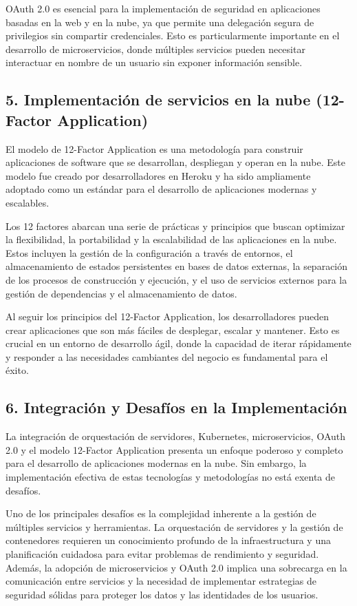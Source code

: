 \documentclass[12pt]{article}
\begin{document}
OAuth 2.0 es esencial para la implementación de seguridad en aplicaciones basadas en la web y en la nube, ya que permite una delegación segura de privilegios sin compartir credenciales. Esto es particularmente importante en el desarrollo de microservicios, donde múltiples servicios pueden necesitar interactuar en nombre de un usuario sin exponer información sensible.

\subsection*{5. Implementación de servicios en la nube (12-Factor Application)}
El modelo de 12-Factor Application es una metodología para construir aplicaciones de software que se desarrollan, despliegan y operan en la nube. Este modelo fue creado por desarrolladores en Heroku y ha sido ampliamente adoptado como un estándar para el desarrollo de aplicaciones modernas y escalables.

Los 12 factores abarcan una serie de prácticas y principios que buscan optimizar la flexibilidad, la portabilidad y la escalabilidad de las aplicaciones en la nube. Estos incluyen la gestión de la configuración a través de entornos, el almacenamiento de estados persistentes en bases de datos externas, la separación de los procesos de construcción y ejecución, y el uso de servicios externos para la gestión de dependencias y el almacenamiento de datos.

Al seguir los principios del 12-Factor Application, los desarrolladores pueden crear aplicaciones que son más fáciles de desplegar, escalar y mantener. Esto es crucial en un entorno de desarrollo ágil, donde la capacidad de iterar rápidamente y responder a las necesidades cambiantes del negocio es fundamental para el éxito.

\subsection*{6. Integración y Desafíos en la Implementación}
La integración de orquestación de servidores, Kubernetes, microservicios, OAuth 2.0 y el modelo 12-Factor Application presenta un enfoque poderoso y completo para el desarrollo de aplicaciones modernas en la nube. Sin embargo, la implementación efectiva de estas tecnologías y metodologías no está exenta de desafíos.

Uno de los principales desafíos es la complejidad inherente a la gestión de múltiples servicios y herramientas. La orquestación de servidores y la gestión de contenedores requieren un conocimiento profundo de la infraestructura y una planificación cuidadosa para evitar problemas de rendimiento y seguridad. Además, la adopción de microservicios y OAuth 2.0 implica una sobrecarga en la comunicación entre servicios y la necesidad de implementar estrategias de seguridad sólidas para proteger los datos y las identidades de los usuarios.
\end{document}
